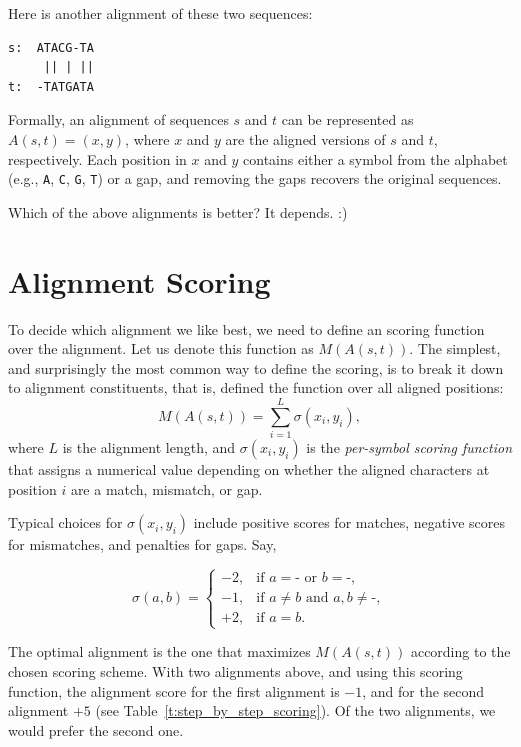 Here is another alignment of these two sequences:

\begin{verbatim}
s:  ATACG-TA
     || | ||
t:  -TATGATA
\end{verbatim}

Formally, an alignment of sequences $s$ and $t$ can be represented as
$A(s,t) = (x, y)$, where $x$ and $y$ are the aligned versions of $s$ and $t$,
respectively. Each position in $x$ and $y$ contains either a symbol from the
alphabet (e.g., \texttt{A}, \texttt{C}, \texttt{G}, \texttt{T}) or a gap, and
removing the gaps recovers the original sequences.

Which of the above alignments is better? It depends. :)

\section{Alignment Scoring}

To decide which alignment we like best, we need to define an scoring function over the alignment. Let us denote this function as $M(A(s,t))$. The simplest, and surprisingly the most common way to define the scoring, is to break it down to alignment constituents, that is, defined the function over all aligned positions:
\[
M(A(s,t)) = \sum_{i=1}^{L} \sigma(x_i, y_i),
\]
where $L$ is the alignment length, and $\sigma(x_i, y_i)$ is the
\emph{per-symbol scoring function} that assigns a numerical value depending on
whether the aligned characters at position $i$ are a match, mismatch, or gap.

Typical choices for $\sigma(x_i, y_i)$ include positive scores for matches, negative scores for
mismatches, and penalties for gaps. Say,

\[
\sigma(a,b) =
\begin{cases}
-2, & \text{if } a = \texttt{-} \text{ or } b = \texttt{-}, \\
-1, & \text{if } a \neq b \text{ and } a,b \neq \texttt{-}, \\
+2, & \text{if } a = b.
\end{cases}
\]

The optimal alignment is the one that maximizes $M(A(s,t))$ according to the chosen scoring scheme. With two alignments above, and using this scoring function, the alignment score for the first alignment is $-1$, and for the second alignment $+5$ (see Table~\ref{t:step_by_step_scoring}). Of the two alignments, we would prefer the second one.

